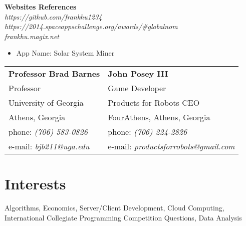 \documentclass[margin,line]{resume}
\begin{document}
\begin{resume}
\textbf{Websites References}
      \vspace{1mm}\\      
\textsl{https://github.com/frankhu1234}
      \vspace{1mm}\\  
\textsl{https://2014.spaceappschallenge.org/awards/\#globalnom}    
\vspace{1mm}\\
\textsl{frankhu.magix.net}    
	\begin{itemize}
	\item App Name: Solar System Miner
	\end{itemize}	
\begin{tabular}{@{}p{6cm}p{6cm}}
\textbf{Professor Brad Barnes}     &  \textbf{John Posey III}      \\
Professor            &
Game Developer                            \\
University of Georgia         &       Products for Robots CEO          \\
Athens, Georgia           			&	     				FourAthens, Athens, Georgia  	 \\
phone: \textsl{(706) 583-0826} &
phone: \textsl{(706) 224-2826}       \\
e-mail: \textsl{bjb211@uga.edu} &
e-mail: \textsl{productsforrobots@gmail.com}       \\
\end{tabular}



    \section{\mysidestyle Interests}

    Algorithms, Economics, Server/Client Development, Cloud Computing, International Collegiate Programming Competition Questions, Data Analysis


\end{resume}
\end{document}
